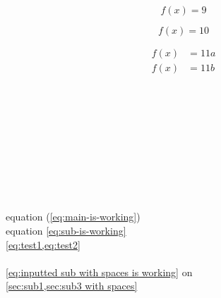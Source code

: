 \documentclass{article}
\begin{document}
\begin{equation}
  \label{eq:test9}
  f(x) = 9
\end{equation}

\begin{equation}
  \label{eq:test10}
  f(x) = 10
\end{equation}

\begin{subequations}
  \begin{align}
    \label{eq:test11a}
    f(x) &= 11a \\
    \label{eq:test11b}
    f(x) &= 11b
  \end{align}
\end{subequations}


\cite{aristotle:physics} \\
\cite[5--10]{aristotle:physics} \\
\cite[see][5--10]{aristotle:physics} \\
\parencite{aristotle:physics} \\
\parencite[5--10]{aristotle:physics} \\
\parencite[see][5--10]{aristotle:physics} \\
\textcite{aristotle:physics} \\
\textcite[5--10]{aristotle:physics} \\
\textcite[see][5--10]{aristotle:physics} \\

equation (\ref{eq:main-is-working}) \\
equation \eqref{eq:sub-is-working} \\
\cref{eq:test1,eq:test2} \\
 \\
\cref{eq:inputted sub with spaces is working} on  \\
\cref{sec:sub1,sec:sub3 with spaces} \\
 \\

\newpage
\glsaddall
\printglossary[
  type=gloss,
  style=long,
  title={Glossary},
  toctitle={Glossary}
]
\printglossary[
  type=symbols,
  style=long,
  title={List of Symbols},
  toctitle={List of Symbols}
]
\end{document}
